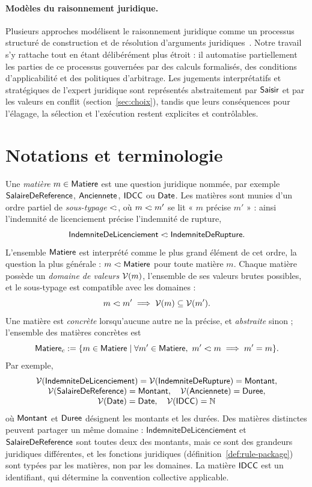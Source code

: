 \documentclass[review]{jflart}
\newcommand{\IndemRupture}{\ensuremath{\mathsf{IndemniteDeRupture}}}
\renewcommand{\Indem}{\ensuremath{\mathsf{IndemniteDeLicenciement}}}
\begin{document}
\paragraph{Modèles du raisonnement juridique.}
Plusieurs approches modélisent le raisonnement juridique comme un processus
structuré de construction et de résolution d'arguments
juridiques~\cite{gordon1993pleadings,benchcapon2009argumentation}. Notre travail
s'y rattache tout en étant délibérément plus étroit : il automatise
partiellement les parties de ce processus gouvernées par des calculs
formalisés, des conditions d'applicabilité et des politiques d'arbitrage. Les
jugements interprétatifs et stratégiques de l'expert juridique sont représentés
abstraitement par \(\mathsf{Saisir}\) et par les valeurs en conflit
(section~\ref{sec:choix}), tandis que leurs conséquences pour l'élagage, la
sélection et l'exécution restent explicites et contrôlables.

\section{Notations et terminologie}\label{sec:notations}

\begin{defi}\label{def:types}
Une \emph{matière} \(m\in\mathsf{Matiere}\) est une question juridique nommée, par
exemple \(\mathsf{SalaireDeReference}\), \(\mathsf{Anciennete}\), \(\mathsf{IDCC}\) ou \(\mathsf{Date}\). Les matières sont
munies d'un ordre partiel de \emph{sous-typage} \(\mathrel{<\!:}\), où
\(m\mathrel{<\!:} m'\) se lit « \(m\) précise \(m'\) » : ainsi l'indemnité de
licenciement précise l'indemnité de rupture,
\[
 \Indem\subtype\IndemRupture.
\]
L'ensemble \(\mathsf{Matiere}\) est interprété comme le plus
grand élément de cet ordre, la question la plus générale :
\(m\mathrel{<\!:}\mathsf{Matiere}\) pour toute matière \(m\). Chaque matière possède un
\emph{domaine de valeurs} \(\mathcal{V}(m)\), l'ensemble de ses valeurs brutes
possibles, et le sous-typage est compatible avec les domaines :
\[
 m\mathrel{<\!:} m'\implies\mathcal{V}(m)\subseteq\mathcal{V}(m').
\]
Une matière est \emph{concrète} lorsqu'aucune autre ne la précise, et
\emph{abstraite} sinon ; l'ensemble des matières concrètes est
\[
 \mathsf{Matiere}_c:=\{m\in\mathsf{Matiere}\mid\forall m'\in\mathsf{Matiere},\ m'\mathrel{<\!:} m\implies m'=m\}.
\]
Par exemple,
\[
\begin{array}{c}
 \Raw(\Indem)=\Raw(\IndemRupture)=\Money,\\
 \Raw(\Salary)=\Money,\quad
 \Raw(\Senior)=\Duration,\\
 \Raw(\DateT)=\mathsf{Date},\quad
 \Raw(\IDCC)=\mathbb N
\end{array}
\]
où \(\mathsf{Montant}\) et \(\mathsf{Duree}\) désignent les montants et les durées. Des
matières distinctes peuvent partager un même domaine : \(\Indem\) et \(\mathsf{SalaireDeReference}\)
sont toutes deux des montants, mais ce sont des grandeurs juridiques
différentes, et les fonctions juridiques (définition~\ref{def:rule-package})
sont typées par les matières, non par les domaines. La matière \(\mathsf{IDCC}\) est un
identifiant, qui détermine la convention collective applicable.
\end{defi}
\end{document}
